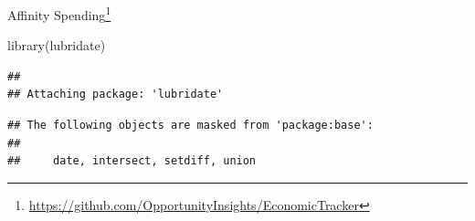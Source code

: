 \documentclass[
]{krantz}
\makeatletter
\newenvironment{Shaded}{\begin{snugshade}}{\end{snugshade}}
\newcommand{\FunctionTok}[1]{\textcolor[rgb]{0,0,0}{#1}}
\newcommand{\NormalTok}[1]{#1}
\renewcommand{\href}[2]{#2\footnote{\url{#1}}}
\newenvironment{kframe}{%
\medskip{}
\setlength{\fboxsep}{.8em}
 \def\at@end@of@kframe{}%
 \ifinner\ifhmode%
  \def\at@end@of@kframe{\end{minipage}}%
  \begin{minipage}{\columnwidth}%
 \fi\fi%
 \def\FrameCommand##1{\hskip\@totalleftmargin \hskip-\fboxsep
 \colorbox{shadecolor}{##1}\hskip-\fboxsep
     \hskip-\linewidth \hskip-\@totalleftmargin \hskip\columnwidth}%
 \MakeFramed {\advance\hsize-\width
   \@totalleftmargin\z@ \linewidth\hsize
   \@setminipage}}%
 {\par\unskip\endMakeFramed%
 \at@end@of@kframe}
\renewenvironment{Shaded}{\begin{kframe}}{\end{kframe}}
\makeatother
\begin{document}
\href{https://github.com/OpportunityInsights/EconomicTracker}{Affinity Spending}

\begin{Shaded}
\begin{Highlighting}[]
\FunctionTok{library}\NormalTok{(lubridate)}
\end{Highlighting}
\end{Shaded}

\begin{verbatim}
## 
## Attaching package: 'lubridate'
\end{verbatim}

\begin{verbatim}
## The following objects are masked from 'package:base':
## 
##     date, intersect, setdiff, union
\end{verbatim}
\end{document}
